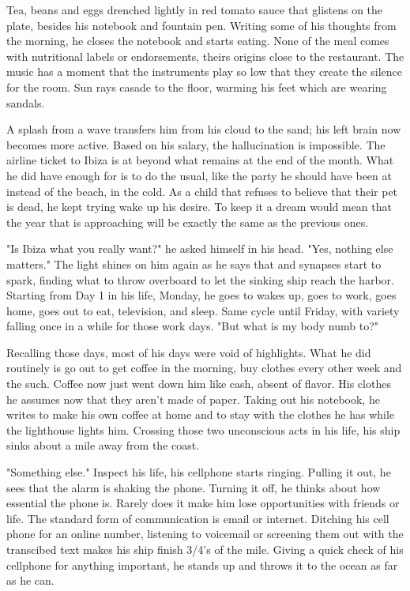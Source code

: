 \begin{Document}
        Tea, beans and eggs drenched lightly in red tomato sauce that glistens on the plate, besides his notebook and fountain pen. Writing some of his thoughts
    from the morning, he closes the notebook and starts eating. None of the meal comes with nutritional labels or endorsements, theirs origins close to the 
    restaurant. The music has a moment that the instruments play so low that they create the silence for the room. Sun rays casade to the floor, warming his
    feet which are wearing sandals. 

        A splash from a wave transfers him from his cloud to the sand; his left brain now becomes more active. Based on his salary, the hallucination is
    impossible. The airline ticket to Ibiza is at beyond what remains at the end of the month. What he did have enough for is to do the usual, like the party he
    should have been at instead of the beach, in the cold. As a child that refuses to believe that their pet is dead, he kept trying wake up his desire. To
    keep it a dream would mean that the year that is approaching will be exactly the same as the previous ones.

       "Is Ibiza what you really want?" he asked himself in his head. "Yes, nothing else matters." The light shines on him again as he says that and synapses start
    to spark, finding what to throw overboard to let the sinking ship reach the harbor. Starting from Day 1 in his life, Monday, he goes to wakes up, goes to work,
    goes home, goes out to eat, television, and sleep. Same cycle until Friday, with variety falling once in a while for those work days. "But what is my body
    numb to?"

        Recalling those days, most of his days were void of highlights. What he did routinely is go out to get coffee in the morning, buy clothes every other
    week and the such. Coffee now just went down him like cash, absent of flavor. His clothes he assumes now that they aren't made of paper. Taking out his
    notebook, he writes to make his own coffee at home and to stay with the clothes he has while the lighthouse lights him. Crossing those two unconscious
    acts in his life, his ship sinks about a mile away from the coast.

        "Something else." Inspect his life, his cellphone starts ringing. Pulling it out, he sees that the alarm is shaking the phone. Turning it off, he 
    thinks about how essential the phone is. Rarely does it make him lose opportunities with friends or life. The standard form of communication is email or
    internet. Ditching his cell phone for an online number, listening to voicemail or screening them out with the transcibed text makes his ship finish 3/4's
    of the mile. Giving a quick check of his cellphone for anything important, he stands up and throws it to the ocean as far as he can.
\end{Document}
